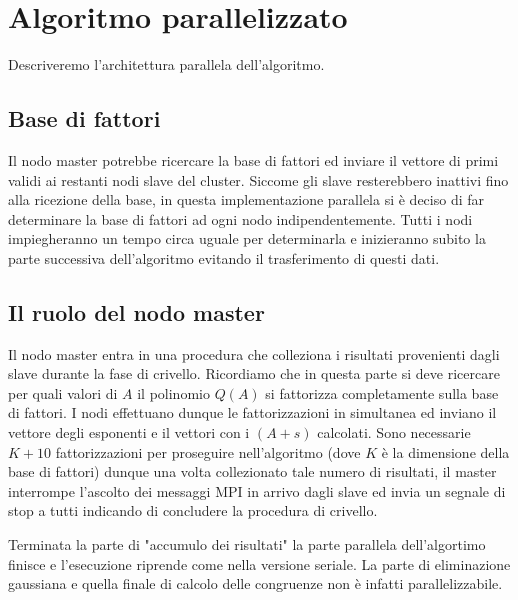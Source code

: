 
\section{Algoritmo parallelizzato}
\label{sec:parallelo}
Descriveremo l'architettura parallela dell'algoritmo.
\subsection{Base di fattori}
Il nodo master potrebbe ricercare la base di fattori ed inviare il
vettore di primi validi ai restanti nodi slave del cluster. Siccome
gli slave resterebbero inattivi fino alla ricezione della base, in
questa implementazione parallela si è deciso di far determinare la
base di fattori ad ogni nodo indipendentemente. Tutti i nodi
impiegheranno un tempo circa uguale per determinarla e inizieranno
subito la parte successiva dell'algoritmo evitando il trasferimento di
questi dati.
\subsection{Il ruolo del nodo master}
Il nodo master entra in una procedura che colleziona i risultati
provenienti dagli slave durante la fase di crivello. Ricordiamo che in
questa parte si deve ricercare per quali valori di $A$ il polinomio $Q(A)$
si fattorizza completamente sulla base di fattori. I nodi effettuano
dunque le fattorizzazioni in simultanea ed
inviano il vettore degli esponenti e il vettori con i $(A + s)$
calcolati. Sono necessarie $K+10$ fattorizzazioni per proseguire
nell'algoritmo (dove $K$ è la dimensione della base di fattori) dunque
una volta collezionato tale numero di risultati, il master interrompe
l'ascolto dei messaggi MPI in arrivo dagli slave ed invia un segnale
di stop a tutti indicando di concludere la procedura di crivello.

Terminata la parte di "accumulo dei risultati" la parte parallela
dell'algortimo finisce e l'esecuzione riprende come nella versione
seriale. La parte di eliminazione gaussiana e quella finale di calcolo
delle congruenze non è infatti parallelizzabile.

